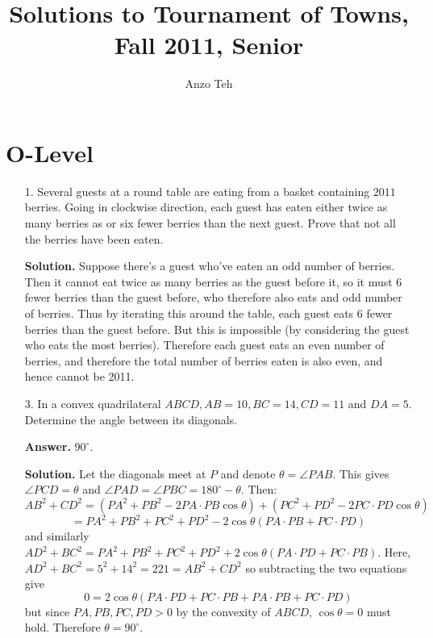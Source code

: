 \documentclass[11pt,a4paper]{article}
\begin{document}
\newcommand{\la}{\leftarrow}
\newcommand{\lra}{\leftrightarrow}
\newcommand{\bbN}{\mathbb{N}}
\newcommand{\bbZ}{\mathbb{Z}}
\newcommand{\dsum}{\displaystyle\sum}
\newcommand{\dprod}{\displaystyle\prod}


\title{Solutions to Tournament of Towns, Fall 2011, Senior}
\author{Anzo Teh}
\date{}
\maketitle

\section*{O-Level}
\begin{enumerate}
	\item[1.] Several guests at a round table are eating from a basket containing $2011$ berries. Going in clockwise direction, each guest has eaten either twice as many berries as or six fewer berries than the next guest. Prove that not all the berries have been eaten.
	
	\textbf{Solution.} Suppose there's a guest who've eaten an odd number of berries. Then it cannot eat twice as many berries as the guest before it, so it must 6 fewer berries than the guest before, who therefore also eats and odd number of berries. Thus by iterating this around the table, each guest eats 6 fewer berries than the guest before. But this is impossible (by considering the guest who eats the most berries). Therefore each guest eats an even number of berries, and therefore the total number of berries eaten is also even, and hence cannot be 2011. 
	
	\item[3.] In a convex quadrilateral $ABCD, AB = 10, BC = 14, CD = 11$ and $DA = 5$. Determine the angle between its diagonals.
	
	\textbf{Answer.} $90^{\circ}$. 
	
	\textbf{Solution.} Let the diagonals meet at $P$ and denote $\theta = \angle PAB$. This gives $\angle PCD=\theta$ and $\angle PAD=\angle PBC=180^{\circ}-\theta$. Then: 
	\[
	AB^2 + CD^2 = (PA^2+PB^2-2PA\cdot PB\cos\theta) + (PC^2+PD^2-2PC\cdot PD \cos\theta) 
	\]\[
	= PA^2+PB^2+PC^2+PD^2 - 2\cos\theta (PA\cdot PB + PC\cdot PD)
	\]
	and similarly $AD^2+BC^2 = PA^2+PB^2+PC^2+PD^2 + 2\cos\theta (PA\cdot PD + PC\cdot PB)$. Here, $AD^2+BC^2=5^2+14^2=221=AB^2+CD^2$ so subtracting the two equations give 
	\[
	0=2\cos\theta (PA\cdot PD + PC\cdot PB+PA\cdot PB + PC\cdot PD)
	\]
	but since $PA, PB, PC, PD>0$ by the convexity of $ABCD$, $\cos\theta=0$ must hold. Therefore $\theta=90^{\circ}$. 
	

\end{enumerate}
\end{document}
